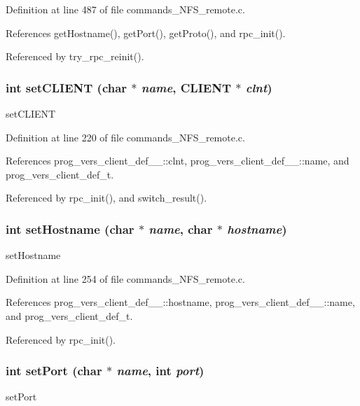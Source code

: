 Definition at line 487 of file commands\_\-NFS\_\-remote.c.

References get\-Hostname(), get\-Port(), get\-Proto(), and rpc\_\-init().

Referenced by try\_\-rpc\_\-reinit().
\subsubsection{\setlength{\rightskip}{0pt plus 5cm}int set\-CLIENT (char $\ast$ {\em name}, CLIENT $\ast$ {\em clnt})}\label{commands__NFS__remote_8c_a22}


set\-CLIENT 

Definition at line 220 of file commands\_\-NFS\_\-remote.c.

References prog\_\-vers\_\-client\_\-def\_\-\_\-::clnt, prog\_\-vers\_\-client\_\-def\_\-\_\-::name, and prog\_\-vers\_\-client\_\-def\_\-t.

Referenced by rpc\_\-init(), and switch\_\-result().
\subsubsection{\setlength{\rightskip}{0pt plus 5cm}int set\-Hostname (char $\ast$ {\em name}, char $\ast$ {\em hostname})}\label{commands__NFS__remote_8c_a24}


set\-Hostname 

Definition at line 254 of file commands\_\-NFS\_\-remote.c.

References prog\_\-vers\_\-client\_\-def\_\-\_\-::hostname, prog\_\-vers\_\-client\_\-def\_\-\_\-::name, and prog\_\-vers\_\-client\_\-def\_\-t.

Referenced by rpc\_\-init().
\subsubsection{\setlength{\rightskip}{0pt plus 5cm}int set\-Port (char $\ast$ {\em name}, int {\em port})}\label{commands__NFS__remote_8c_a28}


set\-Port 

